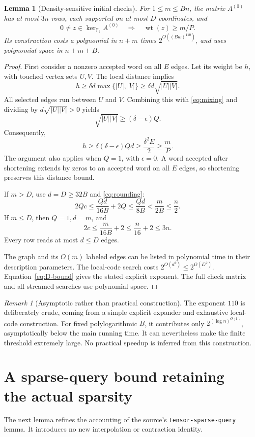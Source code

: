 \documentclass[11pt]{article}
\newtheorem{lemma}[theorem]{Lemma}
\theoremstyle{remark}
\newtheorem{remark}[theorem]{Remark}
\newcommand{\F}{\mathbb F}
\newcommand{\wt}{\operatorname{wt}}
\begin{document}
\begin{lemma}[Density-sensitive initial checks]\label{lem:checks}
For \(1\le m\le Bn\), the matrix \(A^{(0)}\) has at most \(3n\)
rows, each supported on at most \(D\) coordinates, and
\[
 0\ne z\in\ker_{\F_2} A^{(0)}
 \quad\Longrightarrow\quad
 \wt(z)\ge m/P.
\]
Its construction costs a polynomial in \(n+m\) times
\(2^{O((Bw)^{110})}\), and uses polynomial space in \(n+m+B\).
\end{lemma}
\begin{proof}
First consider a nonzero accepted word on all \(E\) edges.
Let its weight be \(h\), with touched vertex sets \(U,V\).
The local distance implies
\[
 h\ge\delta d\max\{|U|,|V|\}
    \ge\delta d\sqrt{|U||V|}.
\]
All selected edges run between \(U\) and \(V\). Combining this with
\eqref{eq:mixing} and dividing by \(d\sqrt{|U||V|}>0\) yields
\[
 \sqrt{|U||V|}\ge(\delta-\epsilon)Q.
\]
Consequently,
\[
 h\ge\delta(\delta-\epsilon)Qd
       \ge \frac{\delta^2 E}{2}
       \ge \frac{m}{P}.
\]
The argument also applies when \(Q=1\), with \(\epsilon=0\).
A word accepted after shortening extends by zeros to an accepted word
on all \(E\) edges, so shortening preserves this distance bound.

If \(m>D\), use \(d=D\ge32B\) and \eqref{eq:rounding}:
\[
 2Qc\le\frac{Qd}{16B}+2Q
       \le\frac{Qd}{8B}
       <\frac{m}{2B}\le\frac n2.
\]
If \(m\le D\), then \(Q=1,d=m\), and
\[
 2c\le\frac{m}{16B}+2\le\frac n{16}+2\le3n.
\]
Every row reads at most \(d\le D\) edges.

The graph and its \(O(m)\) labeled edges can be listed in polynomial
time in their description parameters. The local-code search costs
\(2^{O(d^2)}\le2^{O(D^2)}\).
Equation~\eqref{eq:D-bound} gives the stated explicit exponent.
The full check matrix and all streamed searches use polynomial space.
\end{proof}

\begin{remark}[Asymptotic rather than practical construction]
The exponent \(110\) is deliberately crude, coming from a simple
explicit expander and exhaustive local-code construction.
For fixed polylogarithmic \(B\), it contributes only
\(2^{(\log n)^{O(1)}}\), asymptotically below the main running time.
It can nevertheless make the finite threshold extremely large.
No practical speedup is inferred from this construction.
\end{remark}

\section{A sparse-query bound retaining the actual sparsity}\label{sec:query}
The next lemma refines the accounting of the source's
\texttt{tensor-sparse-query} lemma. It introduces no new interpolation
or contraction identity.
\end{document}
